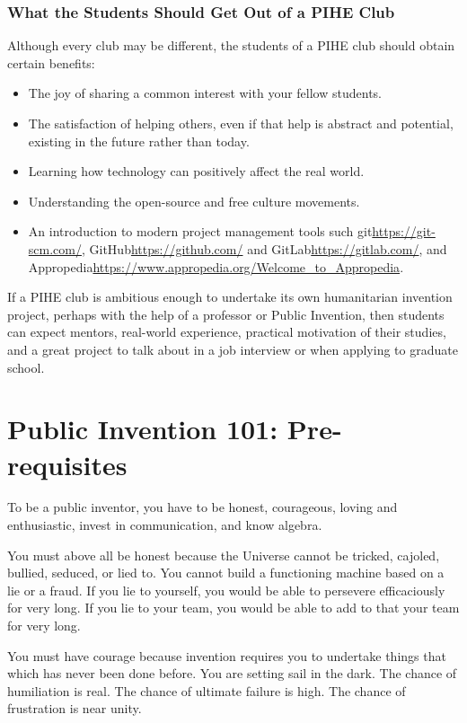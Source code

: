 \documentclass[
	fontsize=10pt, %
	twoside=false, %
	secnumdepth=1, %
]{kaobook}
\begin{document}
\subsection{What the Students Should Get Out of a PIHE Club}

Although every club may be different, the students of a PIHE club should obtain certain benefits:
\begin{itemize}
\item The joy of sharing a common interest with your fellow students.
\item The satisfaction of helping others, even if that help is abstract and potential, existing in the future rather than today.
\item Learning how technology can positively affect the real world.
\item Understanding the open-source and free culture movements.
\item An introduction to modern project management tools such git\url{https://git-scm.com/}, GitHub\url{https://github.com/} and GitLab\url{https://gitlab.com/}, and Appropedia\url{https://www.appropedia.org/Welcome_to_Appropedia}.
\end{itemize}

If a PIHE club is ambitious enough to undertake its own humanitarian
invention project, perhaps with the help of a professor or Public
Invention, then students can expect mentors, real-world experience,
practical motivation of their studies, and a great project to talk
about in a job interview or when applying to graduate school.



\chapter{Public Invention 101: Pre-requisites}

To be a public inventor, you have to be honest,
courageous, loving and enthusiastic, invest in communication, and know algebra.

You must above all be honest because the
Universe cannot be tricked, cajoled, bullied,
seduced, or lied to.
You cannot build a functioning machine based on a
lie or a fraud.
If you lie to yourself, you would be able
to persevere efficaciously for very long.
If you lie to your team, you would be able
to add to that your team for very long.

You must have courage because invention requires you
to undertake things that
which has never been done before.
You are setting sail in the dark.
The chance of humiliation is real.
The chance of ultimate failure is high.
The chance of frustration is near unity.
\end{document}

